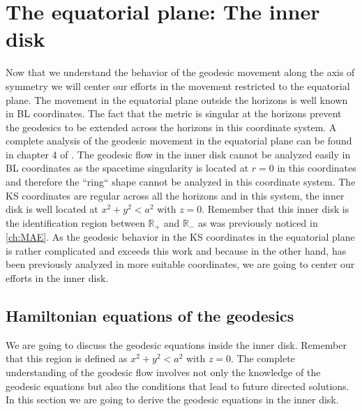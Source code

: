 \chapter{The equatorial plane: The inner disk}\label{ch:ep} %

Now that we understand the behavior of the geodesic movement along the axis of symmetry we will center our efforts in the movement restricted to the equatorial plane. The movement in the equatorial plane outside the horizons is well known in \gls{BL} coordinates. The fact that the metric is singular at the horizons prevent the geodesics to be extended across the horizons in this coordinate system. A complete analysis of the geodesic movement in the equatorial plane can be found in chapter 4 of \cite{o1995geometry}. The geodesic flow in the inner disk cannot be analyzed easily in \gls{BL} coordinates as the spacetime singularity is located at $r=0$ in this coordinates and therefore the ``ring`` shape cannot be analyzed in this coordinate system. The \gls{KS} coordinates are regular across all the horizons and in this system, the inner disk is well located at $x^2+y^2<a^2$ with $z=0$. Remember that this inner disk is the identification region between $\mathbb{R}_+$ and $\mathbb{R}_-$ as was previously noticed in \cref{ch:MAE}. As the geodesic behavior in the \gls{KS} coordinates in the equatorial plane is rather complicated and exceeds this work and because in the other hand, has been previously analyzed in more suitable coordinates, we are going to center our efforts in the inner disk.

\section{Hamiltonian equations of the geodesics}

We are going to discuss the geodesic equations inside the inner disk. Remember that this region is defined as $x^2+y^2<a^2$ with $z=0$. The complete understanding of the geodesic flow involves not only the knowledge of the geodesic equations but also the conditions that lead to future directed solutions. In this section we are going to derive the geodesic equations in the inner disk. 

